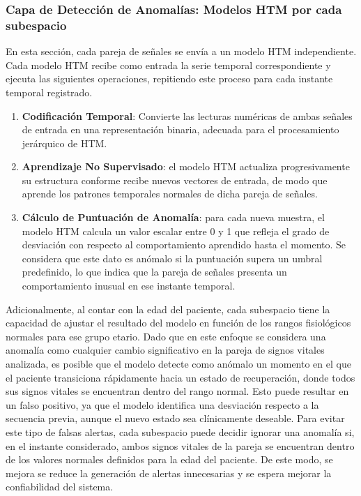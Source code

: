 \bigskip

\subsubsection*{Capa de Detección de Anomalías: Modelos HTM por cada subespacio}

En esta sección, cada pareja de señales se envía a un modelo HTM independiente. Cada modelo HTM recibe como entrada la serie temporal correspondiente y ejecuta las siguientes operaciones, repitiendo este proceso para cada instante temporal registrado.

\begin{enumerate}
  \item \textbf{Codificación Temporal}: Convierte las lecturas numéricas de ambas señales de entrada en una representación binaria, adecuada para el procesamiento jerárquico de HTM.
  \item \textbf{Aprendizaje No Supervisado}: el modelo HTM actualiza progresivamente su estructura conforme recibe nuevos vectores de entrada, de modo que aprende los patrones temporales normales de dicha pareja de señales.
  \item \textbf{Cálculo de Puntuación de Anomalía}: para cada nueva muestra, el modelo HTM calcula un valor escalar entre 0 y 1 que refleja el grado de desviación con respecto al comportamiento aprendido hasta el momento. Se considera que este dato es anómalo si la puntuación supera un umbral predefinido, lo que indica que la pareja de señales presenta un comportamiento inusual en ese instante temporal.
\end{enumerate}

Adicionalmente, al contar con la edad del paciente, cada subespacio tiene la capacidad de ajustar el resultado del modelo en función de los rangos fisiológicos normales para ese grupo etario. Dado que en este enfoque se considera una anomalía como cualquier cambio significativo en la pareja de signos vitales analizada, es posible que el modelo detecte como anómalo un momento en el que el paciente transiciona rápidamente hacia un estado de recuperación, donde todos sus signos vitales se encuentran dentro del rango normal. Esto puede resultar en un falso positivo, ya que el modelo identifica una desviación respecto a la secuencia previa, aunque el nuevo estado sea clínicamente deseable. Para evitar este tipo de falsas alertas, cada subespacio puede decidir ignorar una anomalía si, en el instante considerado, ambos signos vitales de la pareja se encuentran dentro de los valores normales definidos para la edad del paciente. De este modo, se mejora se reduce la generación de alertas innecesarias y se espera mejorar la confiabilidad del sistema.

